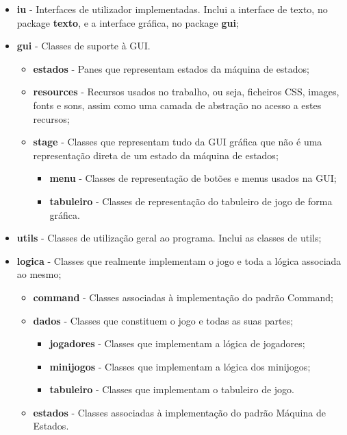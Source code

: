 \documentclass[11pt]{article}
\begin{document}
	\begin{itemize}
		\item \textbf{iu} - Interfaces de utilizador implementadas. Inclui a interface de texto, no package \textbf{texto}, e a interface gráfica, no package \textbf{gui};
		\item \textbf{gui} - Classes de suporte à GUI.
		\begin{itemize}
			\item \textbf{estados} - Panes que representam estados da máquina de estados;
			\item \textbf{resources} - Recursos usados no trabalho, ou seja, ficheiros CSS, images, fonts e sons, assim como uma camada de abstração no acesso a estes recursos;
			\item \textbf{stage} - Classes que representam tudo da GUI gráfica que não é uma representação direta de um estado da máquina de estados;
			\begin{itemize}
				\item \textbf{menu} - Classes de representação de botões e menus usados na GUI;
				\item \textbf{tabuleiro} - Classes de representação do tabuleiro de jogo de forma gráfica.
			\end{itemize}
		\end{itemize}
		\item \textbf{utils} - Classes de utilização geral ao programa. Inclui as classes de utils;
		\item \textbf{logica} - Classes que realmente implementam o jogo e toda a lógica associada ao mesmo;
		\begin{itemize}
			\item \textbf{command} - Classes associadas à implementação do padrão Command;
			\item \textbf{dados} - Classes que constituem o jogo e todas as suas partes;
			\begin{itemize}
				\item \textbf{jogadores} - Classes que implementam a lógica de jogadores;
				\item \textbf{minijogos} - Classes que implementam a lógica dos minijogos;
				\item \textbf{tabuleiro} - Classes que implementam o tabuleiro de jogo.
			\end{itemize}
			\item \textbf{estados} - Classes associadas à implementação do padrão Máquina de Estados.
		\end{itemize}
	\end{itemize}
\end{document}
